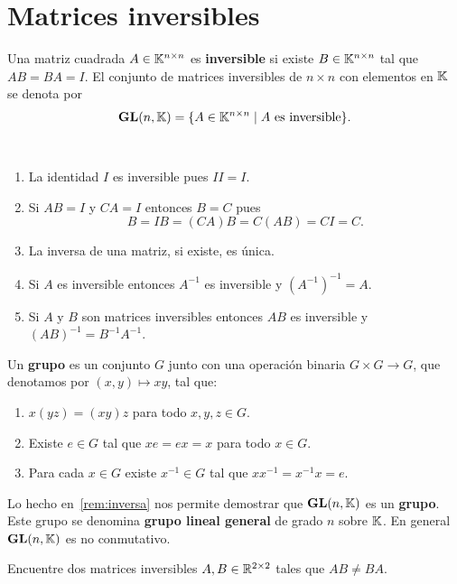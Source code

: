 \section{Matrices inversibles}

\begin{block}
	Una matriz cuadrada $A\in\mathbb{K}^{n\times n}$ es \textbf{inversible} si existe
	$B\in\mathbb{K}^{n\times n}$ tal que $AB=BA=I$. El conjunto de matrices inversibles
	de $n\times n$ con elementos en $\mathbb{K}$ se denota por
	\[
		\mathbf{GL}(n,\mathbb{K})=\{A\in\mathbb{K}^{n\times n}\mid A\text{ es inversible}\}.
	\]
\end{block}

\begin{remarks}\
	\label{rem:inversa}
	\begin{enumerate}
		\item La identidad $I$ es inversible pues $II=I$.
		\item Si $AB=I$ y $CA=I$ entonces $B=C$ pues
			\[
			B=IB=(CA)B=C(AB)=CI=C.
			\]
		\item La inversa de una matriz, si existe, es única.
		\item Si $A$ es inversible entonces $A^{-1}$ es inversible y
			$(A^{-1})^{-1}=A$.
		\item Si $A$ y $B$ son matrices inversibles entonces $AB$ es inversible y
			$(AB)^{-1}=B^{-1}A^{-1}$. 
	\end{enumerate}
\end{remarks}

\begin{remark}
	Un \textbf{grupo} es un conjunto $G$ junto con una operación binaria
	$G\times G\to G$, que denotamos por $(x,y)\mapsto xy$, tal que:
	\begin{enumerate}
		\item $x(yz)=(xy)z$ para todo $x,y,z\in G$.
		\item Existe $e\in G$ tal que $xe=ex=x$ para todo $x\in G$.
		\item Para cada $x\in G$ existe $x^{-1}\in G$ tal que $xx^{-1}=x^{-1}x=e$.
	\end{enumerate}

	Lo hecho en~\ref{rem:inversa} nos permite demostrar que $\mathbf{GL}(n,\mathbb{K})$ es un
	\textbf{grupo}. Este grupo se denomina \textbf{grupo lineal general} de
	grado $n$ sobre $\mathbb{K}$. En general $\mathbf{GL}(n,\mathbb{K})$ es no conmutativo. 
\end{remark}

\begin{xca}
	Encuentre dos matrices inversibles $A,B\in\mathbb{R}^{2\times2}$ tales que $AB\ne
	BA$.
\end{xca}

